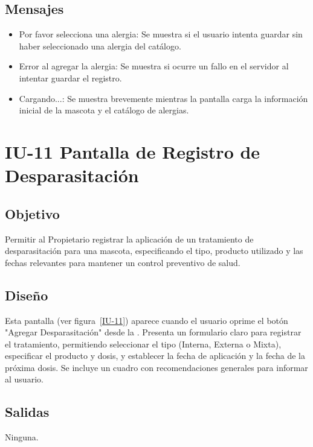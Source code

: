 \subsection{Mensajes}
\begin{itemize}
    \item Por favor selecciona una alergia: Se muestra si el usuario intenta guardar sin haber seleccionado una alergia del catálogo.
    \item Error al agregar la alergia: Se muestra si ocurre un fallo en el servidor al intentar guardar el registro.
    \item Cargando...: Se muestra brevemente mientras la pantalla carga la información inicial de la mascota y el catálogo de alergias.
\end{itemize}
\section{IU-11 Pantalla de Registro de Desparasitación}

\subsection{Objetivo}
    Permitir al Propietario registrar la aplicación de un tratamiento de desparasitación para una mascota, especificando el tipo, producto utilizado y las fechas relevantes para mantener un control preventivo de salud.

\subsection{Diseño}
    Esta pantalla  (ver figura~\ref{IU-11}) aparece cuando el usuario oprime el botón "Agregar Desparasitación" desde la . Presenta un formulario claro para registrar el tratamiento, permitiendo seleccionar el tipo (Interna, Externa o Mixta), especificar el producto y dosis, y establecer la fecha de aplicación y la fecha de la próxima dosis. Se incluye un cuadro con recomendaciones generales para informar al usuario.


\subsection{Salidas}	
    Ninguna.

